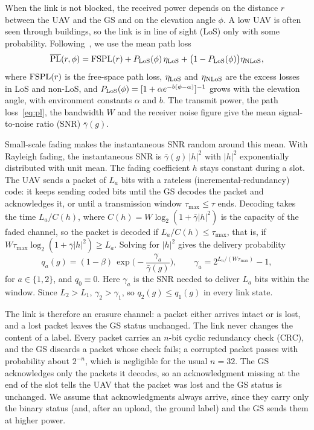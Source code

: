 \documentclass[journal]{IEEEtran}
\theoremstyle{remark}
\begin{document}
When the link is not blocked, the received power depends on the distance $r$ between the UAV and the GS and on the elevation angle $\phi$. A low UAV is often seen through buildings, so the link is in line of sight (LoS) only with some probability. Following~\cite{alhourani2014lap}, we use the mean path loss
\begin{equation}\label{eq:pl}
\overline{\rm PL}(r,\phi)={\rm FSPL}(r)+P_{\rm LoS}(\phi)\,\eta_{\rm LoS}+\big(1-P_{\rm LoS}(\phi)\big)\eta_{\rm NLoS},
\end{equation}
where ${\rm FSPL}(r)$ is the free-space path loss, $\eta_{\rm LoS}$ and $\eta_{\rm NLoS}$ are the excess losses in LoS and non-LoS, and $P_{\rm LoS}(\phi)=[1+\alpha e^{-b(\phi-\alpha)}]^{-1}$ grows with the elevation angle, with environment constants $\alpha$ and $b$. The transmit power, the path loss~\eqref{eq:pl}, the bandwidth $W$ and the receiver noise figure give the mean signal-to-noise ratio (SNR) $\bar\gamma(g)$.

Small-scale fading makes the instantaneous SNR random around this mean. With Rayleigh fading, the instantaneous SNR is $\bar\gamma(g)\,|h|^2$ with $|h|^2$ exponentially distributed with unit mean. The fading coefficient $h$ stays constant during a slot. The UAV sends a packet of $L_a$ bits with a rateless (incremental-redundancy) code: it keeps sending coded bits until the GS decodes the packet and acknowledges it, or until a transmission window $\tau_{\max}\le\tau$ ends. Decoding takes the time $L_a/C(h)$, where $C(h)=W\log_2(1+\bar\gamma|h|^2)$ is the capacity of the faded channel, so the packet is decoded if $L_a/C(h)\le\tau_{\max}$, that is, if $W\tau_{\max}\log_2(1+\bar\gamma|h|^2)\ge L_a$. Solving for $|h|^2$ gives the delivery probability
\begin{equation}\label{eq:succ}
q_a(g)=(1-\beta)\,\exp\!\Big(-\frac{\gamma_a}{\bar\gamma(g)}\Big),\qquad \gamma_a=2^{L_a/(W\tau_{\max})}-1,
\end{equation}
for $a\in\{1,2\}$,
and $q_0\equiv0$. Here $\gamma_a$ is the SNR needed to deliver $L_a$ bits within the window. Since $L_2>L_1$, $\gamma_2>\gamma_1$, so $q_2(g)\le q_1(g)$ in every link state.

The link is therefore an erasure channel: a packet either arrives intact or is lost, and a lost packet leaves the GS status unchanged. The link never changes the content of a label. Every packet carries an $n$-bit cyclic redundancy check (CRC), and the GS discards a packet whose check fails; a corrupted packet passes with probability about $2^{-n}$, which is negligible for the usual $n=32$. The GS acknowledges only the packets it decodes, so an acknowledgment missing at the end of the slot tells the UAV that the packet was lost and the GS status is unchanged. We assume that acknowledgments always arrive, since they carry only the binary status (and, after an upload, the ground label) and the GS sends them at higher power.
\end{document}
